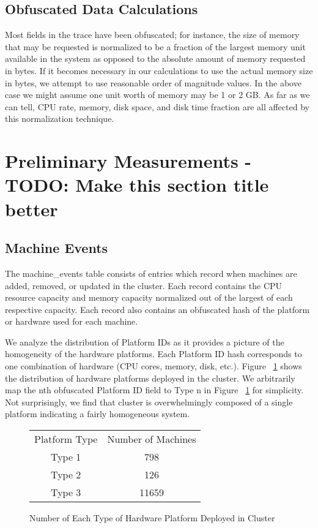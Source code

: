 \documentclass{sig-alternate}
\begin{document}
\subsection{Obfuscated Data Calculations}

Most fields in the trace have been obfuscated; for instance, the size of memory that may be requested is normalized to be a fraction of the largest memory unit available in the system as opposed to the absolute amount of memory requested in bytes.
If it becomes necessary in our calculations to use the actual memory size in bytes, we attempt to use reasonable order of magnitude values.
In the above case we might assume one unit worth of memory may be 1 or 2 GB.
As far as we can tell, CPU rate, memory, disk space, and disk time fraction are all affected by this normalization technique.

\section{Preliminary Measurements - TODO: Make this section title better}

\subsection{Machine Events}

The machine_events table consists of entries which record when machines are added, removed, or updated in the cluster.
Each record contains the CPU resource capacity and memory capacity normalized out of the largest of each respective capacity.
Each record also contains an obfuscated hash of the platform or hardware used for each machine.

We analyze the distribution of Platform IDs as it provides a picture of the homogeneity of the hardware platforms.
Each Platform ID hash corresponds to one combination of hardware (CPU cores, memory, disk, etc.).
Figure ~\ref{platform_dist} shows the distribution of hardware platforms deployed in the cluster.
We arbitrarily map the nth obfuscated Platform ID field to Type n in Figure ~\ref{platform_dist} for simplicity.
Not surprisingly, we find that cluster is overwhelmingly composed of a single platform indicating a fairly homogeneous system.

\begin{figure}
\begin{tabular}{| c | c |}
Platform Type & Number of Machines\\
Type 1 & 798\\
Type 2 & 126\\
Type 3 & 11659 \\
\end{tabular}
\label{platform_dist}
\caption{Number of Each Type of Hardware Platform Deployed in Cluster}
\end{figure}
\end{document}
